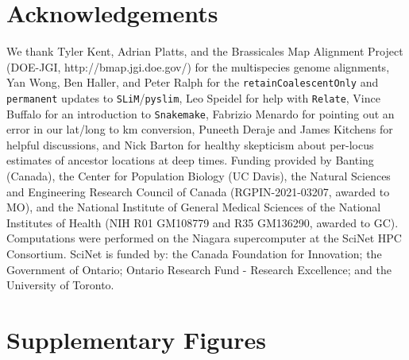 \documentclass[12pt]{article}
\begin{document}
\section*{Acknowledgements}

We thank Tyler Kent, Adrian Platts, and the Brassicales Map Alignment Project (DOE-JGI, http://bmap.jgi.doe.gov/) for the multispecies genome alignments,
Yan Wong, Ben Haller, and Peter Ralph for the \texttt{retainCoalescentOnly} and \texttt{permanent} updates to \texttt{SLiM}/\texttt{pyslim}, 
Leo Speidel for help with \texttt{Relate}, 
Vince Buffalo for an introduction to \texttt{Snakemake},
Fabrizio Menardo for pointing out an error in our lat/long to km conversion,
Puneeth Deraje and James Kitchens for helpful discussions,
and Nick Barton for healthy skepticism about per-locus estimates of ancestor locations at deep times.
%
Funding provided by Banting (Canada), the Center for Population Biology (UC Davis), the Natural Sciences and Engineering Research Council of Canada (RGPIN-2021-03207, awarded to MO), and the National Institute of General Medical Sciences of the National Institutes of Health (NIH R01 GM108779 and R35 GM136290, awarded to GC).
Computations were performed on the Niagara supercomputer at the SciNet HPC Consortium. 
SciNet is funded by: the Canada Foundation for Innovation; the Government of Ontario; Ontario Research Fund - Research Excellence; and the University of Toronto.

%



\newpage
\section*{Supplementary Figures}
\label{sec:appendix}
\end{document}

